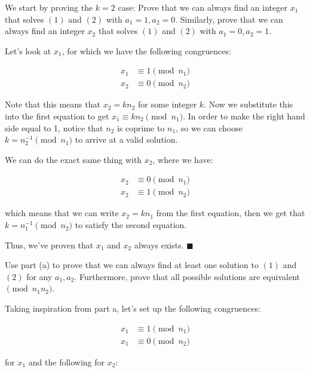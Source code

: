 \documentclass[11pt]{article}
\begin{document}
\begin{Parts}
\Part We start by proving the $k=2$ case: Prove that we can always find an integer $x_1$
that solves $(1)$ and $(2)$ with $a_1 = 1, a_2 = 0$. Similarly, prove that we can always
find an integer $x_2$ that solves $(1)$ and $(2)$ with $a_1 = 0, a_2 = 1$.


\begin{solution}
    Let's look at $x_1$, for which we have the following congruences:

    \begin{align*}
        x_1 &\equiv 1 \pmod{n_1}\\
        x_2 &\equiv 0 \pmod{n_2}
    \end{align*}

    Note that this means that $x_2 = kn_2$ for some integer $k$. Now we substitute this into the first equation to get $x_1 \equiv kn_2 \pmod{n_1}$. In order to make the right hand side equal to 1, notice that $n_2$ is coprime to $n_1$, so we can choose $k = n_2^{-1} \pmod {n_1}$ to arrive at a valid solution. 

    We can do the exact same thing with $x_2$, where we have:
    
    \begin{align*}
        x_2 &\equiv 0 \pmod{n_1}\\
        x_2 &\equiv 1 \pmod{n_2}
    \end{align*}
    
    which means that we can write $x_2 = kn_1$ from the first equation, then we get that $k = n_1^{-1} \pmod{n_2}$ to satisfy the second equation.

    Thus, we've proven that $x_1$ and $x_2$ always exists. $\blacksquare$
\end{solution}

\Part Use part (a) to prove that we can always find at least one solution to $(1)$ and $(2)$ for any $a_1,a_2$. Furthermore, prove that all possible solutions are equivalent
$\pmod{n_1n_2}$.

\begin{solution}
    Taking inspiration from part a, let's set up the following congruences:

    \begin{align*}
        x_1 &\equiv 1 \pmod{n_1}\\
        x_1 &\equiv 0 \pmod{n_2}
    \end{align*}

    for $x_1$ and the following for $x_2$:


\end{solution}
\end{Parts}
\end{document}
